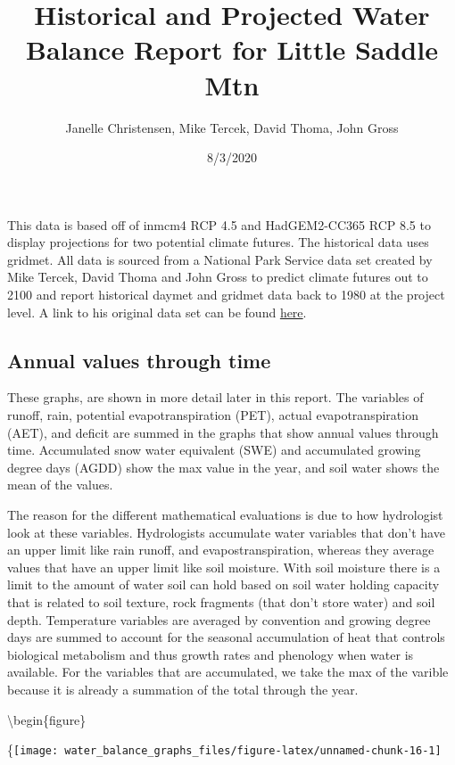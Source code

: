 \documentclass[
]{article}
\title{Historical and Projected Water Balance Report for Little Saddle Mtn}
\author{Janelle Christensen, Mike Tercek, David Thoma, John Gross}
\date{8/3/2020}
\begin{document}
\maketitle

This data is based off of inmcm4 RCP 4.5 and HadGEM2-CC365 RCP 8.5 to
display projections for two potential climate futures. The historical
data uses gridmet. All data is sourced from a National Park Service data
set created by Mike Tercek, David Thoma and John Gross to predict
climate futures out to 2100 and report historical daymet and gridmet
data back to 1980 at the project level. A link to his original data set
can be found
\href{http://www.yellowstone.solutions/thredds/catalog.html}{here}.

\hypertarget{annual-values-through-time}{%
\subsection{Annual values through
time}\label{annual-values-through-time}}

These graphs, are shown in more detail later in this report. The
variables of runoff, rain, potential evapotranspiration (PET), actual
evapotranspiration (AET), and deficit are summed in the graphs that show
annual values through time. Accumulated snow water equivalent (SWE) and
accumulated growing degree days (AGDD) show the max value in the year,
and soil water shows the mean of the values.

The reason for the different mathematical evaluations is due to how
hydrologist look at these variables. Hydrologists accumulate water
variables that don't have an upper limit like rain runoff, and
evapostranspiration, whereas they average values that have an upper
limit like soil moisture. With soil moisture there is a limit to the
amount of water soil can hold based on soil water holding capacity that
is related to soil texture, rock fragments (that don't store water) and
soil depth. Temperature variables are averaged by convention and growing
degree days are summed to account for the seasonal accumulation of heat
that controls biological metabolism and thus growth rates and phenology
when water is available. For the variables that are accumulated, we take
the max of the varible because it is already a summation of the total
through the year.

\textbackslash begin\{figure\}

\{\centering \texttt{[image: water\_balance\_graphs\_files/figure-latex/unnamed-chunk-16-1]}
\end{document}
